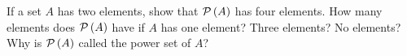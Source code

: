 \documentclass[../main.tex]{subfiles}
\begin{document}
\problem{}
If a set \(A\) has two elements, show that \(\mathcal{P}\left(A\right)\) has four elements.
How many elements does \(\mathcal{P}\left(A\right)\) have if \(A\) has one element? Three
elements? No elements? Why is \(\mathcal{P}\left(A\right)\) called the power set of \(A\)?






\end{document}

